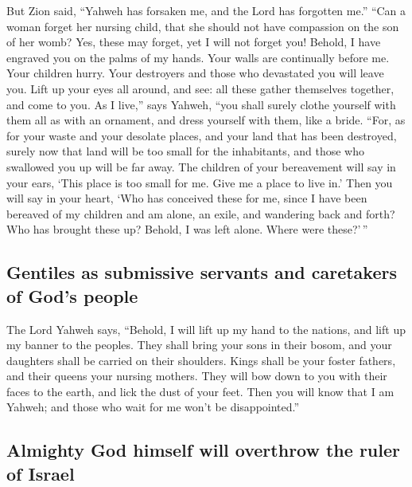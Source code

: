  But Zion said, ``Yahweh has forsaken me, and the Lord
has forgotten me.''  ``Can a woman forget her nursing
child, that she should not have compassion on the son of her womb? Yes,
these may forget, yet I will not forget you!  Behold, I
have engraved you on the palms of my hands. Your walls are continually
before me.  Your children hurry. Your destroyers and
those who devastated you will leave you.  Lift up your
eyes all around, and see: all these gather themselves together, and come
to you. As I live,'' says Yahweh, ``you shall surely clothe yourself
with them all as with an ornament, and dress yourself with them, like a
bride.  ``For, as for your waste and your desolate
places, and your land that has been destroyed, surely now that land will
be too small for the inhabitants, and those who swallowed you up will be
far away.  The children of your bereavement will say in
your ears, `This place is too small for me. Give me a place to live in.'
 Then you will say in your heart, `Who has conceived
these for me, since I have been bereaved of my children and am alone, an
exile, and wandering back and forth? Who has brought these up? Behold, I
was left alone. Where were these?'\,''

\hypertarget{gentiles-as-submissive-servants-and-caretakers-of-gods-people}{%
\subsection{Gentiles as submissive servants and caretakers of God's
people}\label{gentiles-as-submissive-servants-and-caretakers-of-gods-people}}

 The Lord Yahweh says, ``Behold, I will lift up my hand
to the nations, and lift up my banner to the peoples. They shall bring
your sons in their bosom, and your daughters shall be carried on their
shoulders.  Kings shall be your foster fathers, and their
queens your nursing mothers. They will bow down to you with their faces
to the earth, and lick the dust of your feet. Then you will know that I
am Yahweh; and those who wait for me won't be disappointed.''

\hypertarget{almighty-god-himself-will-overthrow-the-ruler-of-israel}{%
\subsection{Almighty God himself will overthrow the ruler of
Israel}\label{almighty-god-himself-will-overthrow-the-ruler-of-israel}}

